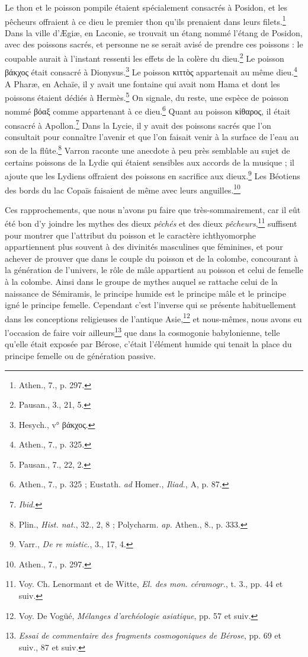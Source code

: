 \documentclass[a4paper, 11pt, oneside]{article}
\begin{document}
Le thon et le poisson pompile étaient spécialement consacrés à Posidon, et les pêcheurs offraient à ce dieu le premier thon qu'ils prenaient dans leurs filets.\footnote{Athen., 7., p. 297.} Dans la ville d'Ægiæ, en Laconie, se trouvait un étang nommé l'étang de Posidon, avec des poissons sacrés, et personne ne se serait avisé de prendre ces poissons : le coupable aurait à l'instant ressenti les effets de la colère du dieu.\footnote{Pausan., 3., 21, 5.} Le poisson βάκχος était consacré à Dionysus.\footnote{Hesych., v° βάκχος.} Le poisson κιττὸς appartenait au même dieu.\footnote{Athen., 7., p. 325.} A Pharæ, en Achaïe, il y avait une fontaine qui avait nom Hama et dont les poissons étaient dédiés à Hermès.\footnote{Pausan., 7., 22, 2.} On signale, du reste, une espèce de poisson nommé βόαξ comme appartenant à ce dieu.\footnote{Athen., 7., p. 325 ; Eustath. \emph{ad} Homer., \emph{Iliad.}, A, p. 87.} Quant au poisson κίθαρος, il était consacré à Apollon.\footnote{\emph{Ibid.}} Dans la Lycie, il y avait des poissons sacrés que l'on consultait pour connaître l'avenir et que l'on faisait venir à la surface de l'eau au son de la flûte.\footnote{Plin., \emph{Hist. nat.}, 32., 2, 8 ; Polycharm. \emph{ap.} Athen., 8., p. 333.} Varron raconte une anecdote à peu près semblable au sujet de certains poissons de la Lydie qui étaient sensibles aux accords de la musique ; il ajoute que les Lydiens offraient des poissons en sacrifice aux dieux.\footnote{Varr., \emph{De re mistic.}, 3., 17, 4.} Les Béotiens des bords du lac Copaïs faisaient de même avec leurs anguilles.\footnote{Athen., 7., p. 297.}

Ces rapprochements, que nous n'avons pu faire que très-sommairement, car il eût été bon d'y joindre les mythes des dieux \emph{pêchés} et des dieux \emph{pêcheurs},\footnote{Voy. Ch. Lenormant et de Witte, \emph{El. des mon. céramogr.}, t. 3., pp. 44 et suiv.} suffisent pour montrer que l'attribut du poisson et le caractère ichthyomorphe appartiennent plus souvent à des divinités masculines que féminines, et pour achever de prouver que dans le couple du poisson et de la colombe, concourant à la génération de l'univers, le rôle de mâle appartient au poisson et celui de femelle à la colombe. Ainsi dans le groupe de mythes auquel se rattache celui de la naissance de Sémiramis, le principe humide est le principe mâle et le principe igné le principe femelle. Cependant c'est l'inverse qui se présente habituellement dans les conceptions religieuses de l'antique Asie,\footnote{Voy. De Vogüé, \emph{Mélanges d'archéologie asiatique}, pp. 57 et suiv.} et nous-mêmes, nous avons eu l'occasion de faire voir ailleurs\footnote{\emph{Essai de commentaire des fragments cosmogoniques de Bérose}, pp. 69 et suiv., 87 et suiv.} que dans la cosmogonie babylonienne, telle qu'elle était exposée par Bérose, c'était l'élément humide qui tenait la place du principe femelle ou de génération passive.
\end{document}

